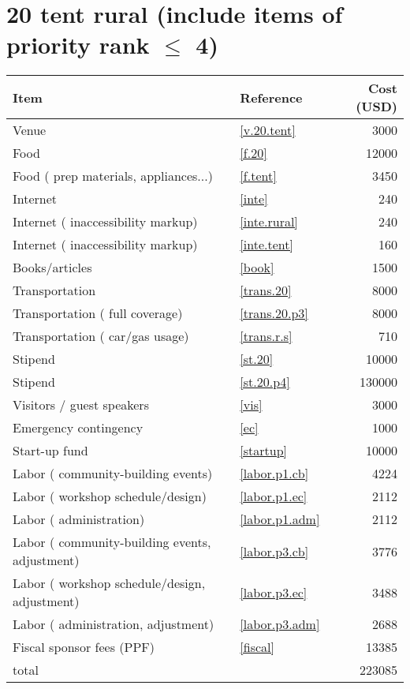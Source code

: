 \section*{20 tent rural (include items of priority rank $\leq$ 4)}
\begin{center}
\begin{tabular}{llr}
Item & Reference & Cost (USD) \\ \hline
Venue & \ref{v.20.tent} & 3000 \\
Food & \ref{f.20} & 12000 \\
Food ( prep materials, appliances...) & \ref{f.tent} & 3450 \\
Internet & \ref{inte} & 240 \\
Internet ( inaccessibility markup) & \ref{inte.rural} & 240 \\
Internet ( inaccessibility markup) & \ref{inte.tent} & 160 \\
Books/articles & \ref{book} & 1500 \\
Transportation & \ref{trans.20} & 8000 \\
Transportation ( full coverage) & \ref{trans.20.p3} & 8000 \\
Transportation ( car/gas usage) & \ref{trans.r.s} & 710 \\
Stipend & \ref{st.20} & 10000 \\
Stipend & \ref{st.20.p4} & 130000 \\
Visitors / guest speakers & \ref{vis} & 3000 \\
Emergency contingency & \ref{ec} & 1000 \\
Start-up fund & \ref{startup} & 10000 \\
Labor ( community-building events) & \ref{labor.p1.cb} & 4224 \\
Labor ( workshop schedule/design) & \ref{labor.p1.ec} & 2112 \\
Labor ( administration) & \ref{labor.p1.adm} & 2112 \\
Labor ( community-building events, adjustment) & \ref{labor.p3.cb} & 3776 \\
Labor ( workshop schedule/design, adjustment) & \ref{labor.p3.ec} & 3488 \\
Labor ( administration, adjustment) & \ref{labor.p3.adm} & 2688 \\
Fiscal sponsor fees (PPF) & \ref{fiscal} & 13385 \\ \hline
total &  & 223085
\end{tabular}
\end{center}
\newpage
